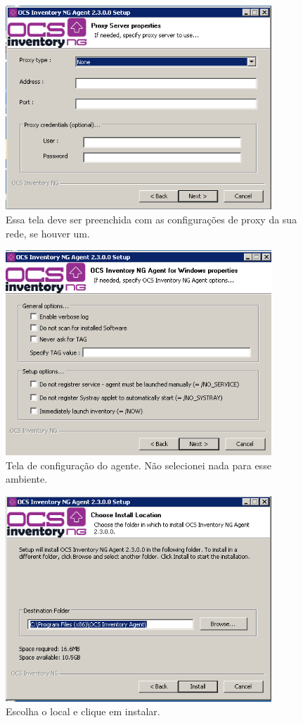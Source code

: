 \documentclass[
               12pt,             %
               a4paper,          %
               chapter=TITLE,    %
               section=TITLE,    %
               english,
               brazil            
]{article}
\begin{document}
\begin{figure}
	
	\center
	\includegraphics[width=10cm]{imagens/5.PNG}
	\caption{Essa tela deve ser preenchida com as configurações de proxy da sua rede, se houver um.}
	 
\end{figure}

\begin{figure}
	
	\center
	\includegraphics[width=10cm]{imagens/6.PNG}
	\caption{Tela de configuração do agente. Não selecionei nada para esse ambiente.}
	 
\end{figure}

\begin{figure}
	
	\center
	\includegraphics[width=10cm]{imagens/7.PNG}
	\caption{Escolha o local e clique em instalar.}
	 
\end{figure}
\end{document}
